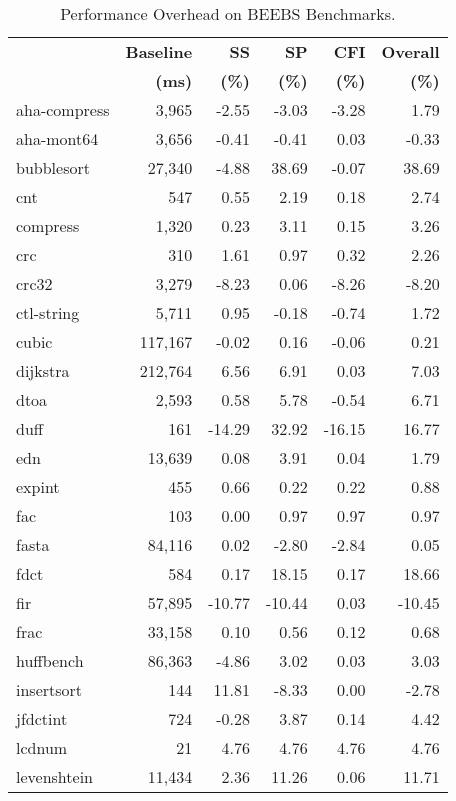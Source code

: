 %
%
\begin{table}[ptb]
\caption{Performance Overhead on BEEBS Benchmarks.}
\centering
\sffamily
\footnotesize{
\begin{tabular}{@{}lrrrrr@{}}
\toprule
& \textbf{Baseline} & \textbf{SS} & \textbf{SP} & \textbf{CFI} & \textbf{Overall} \\
& \textbf{(ms)} & \textbf{(\%)} & \textbf{(\%)} & \textbf{(\%)} & \textbf{(\%)} \\
\midrule
aha-compress & 3,965 & -2.55 & -3.03 & -3.28 & 1.79 \\
aha-mont64 & 3,656 & -0.41 & -0.41 & 0.03 & -0.33 \\
bubblesort & 27,340 & -4.88 & 38.69 & -0.07 & 38.69 \\
cnt & 547 & 0.55 & 2.19 & 0.18 & 2.74 \\
compress & 1,320 & 0.23 & 3.11 & 0.15 & 3.26 \\
crc & 310 & 1.61 & 0.97 & 0.32 & 2.26 \\
crc32 & 3,279 & -8.23 & 0.06 & -8.26 & -8.20 \\
ctl-string & 5,711 & 0.95 & -0.18 & -0.74 & 1.72 \\
cubic & 117,167 & -0.02 & 0.16 & -0.06 & 0.21 \\
dijkstra & 212,764 & 6.56 & 6.91 & 0.03 & 7.03 \\
dtoa & 2,593 & 0.58 & 5.78 & -0.54 & 6.71 \\
duff & 161 & -14.29 & 32.92 & -16.15 & 16.77 \\
edn & 13,639 & 0.08 & 3.91 & 0.04 & 1.79 \\
expint & 455 & 0.66 & 0.22 & 0.22 & 0.88 \\
fac & 103 & 0.00 & 0.97 & 0.97 & 0.97 \\
fasta & 84,116 & 0.02 & -2.80 & -2.84 & 0.05 \\
fdct & 584 & 0.17 & 18.15 & 0.17 & 18.66 \\
fir & 57,895 & -10.77 & -10.44 & 0.03 & -10.45 \\
frac & 33,158 & 0.10 & 0.56 & 0.12 & 0.68 \\
huffbench & 86,363 & -4.86 & 3.02 & 0.03 & 3.03 \\
insertsort & 144 & 11.81 & -8.33 & 0.00 & -2.78 \\
jfdctint & 724 & -0.28 & 3.87 & 0.14 & 4.42 \\
lcdnum & 21 & 4.76 & 4.76 & 4.76 & 4.76 \\
levenshtein & 11,434 & 2.36 & 11.26 & 0.06 & 11.71 \\

\end{tabular}}
\end{table}

